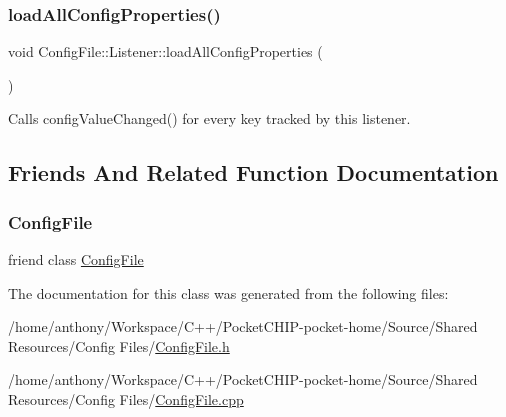 \subsubsection{\texorpdfstring{load\+All\+Config\+Properties()}{loadAllConfigProperties()}}
{\footnotesize\ttfamily void Config\+File\+::\+Listener\+::load\+All\+Config\+Properties (\begin{DoxyParamCaption}{ }\end{DoxyParamCaption})\hspace{0.3cm}{\ttfamily [protected]}}

Calls config\+Value\+Changed() for every key tracked by this listener. 

\subsection{Friends And Related Function Documentation}
\mbox{\label{classConfigFile_1_1Listener_a1b8ab5fe482c5910209dfb9815de99c4}} 
\subsubsection{\texorpdfstring{Config\+File}{ConfigFile}}
{\footnotesize\ttfamily friend class \mbox{\hyperlink{classConfigFile}{Config\+File}}\hspace{0.3cm}{\ttfamily [friend]}}



The documentation for this class was generated from the following files\+:\begin{DoxyCompactItemize}
\item 
/home/anthony/\+Workspace/\+C++/\+Pocket\+C\+H\+I\+P-\/pocket-\/home/\+Source/\+Shared Resources/\+Config Files/\mbox{\hyperlink{ConfigFile_8h}{Config\+File.\+h}}\item 
/home/anthony/\+Workspace/\+C++/\+Pocket\+C\+H\+I\+P-\/pocket-\/home/\+Source/\+Shared Resources/\+Config Files/\mbox{\hyperlink{ConfigFile_8cpp}{Config\+File.\+cpp}}\end{DoxyCompactItemize}
